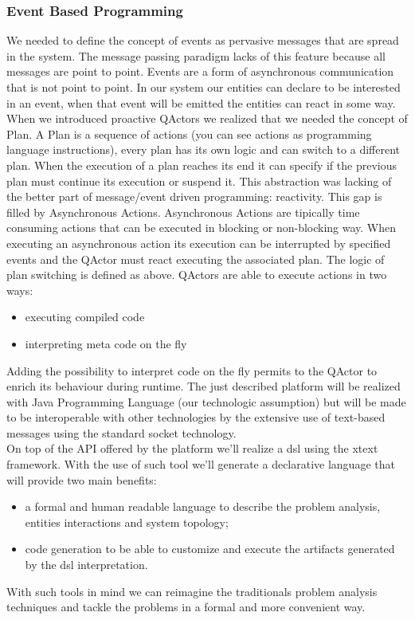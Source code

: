 \documentclass{llncs}
\begin{document}
\subsubsection{Event Based Programming}
	We needed to define the concept of events as pervasive messages that are spread in the system. The message passing paradigm lacks of this feature because all messages are point to point. Events are a form of asynchronous communication that is not point to point. In our system our entities can declare to be interested in an event, when that event will be emitted the entities can react in some way.\\
	When we introduced proactive QActors we realized that we needed the concept of Plan. A Plan is a sequence of actions (you can see actions as programming language instructions), every plan has its own logic and can switch to a different plan. When the execution of a plan reaches its end it can specify if the previous plan must continue its execution or suspend it.
	This abstraction was lacking of the better part of message/event driven programming: reactivity. This gap is filled by Asynchronous Actions.
	Asynchronous Actions are tipically time consuming actions that can be executed in blocking or non-blocking way. When executing an asynchronous action its execution can be interrupted by specified events and the QActor must react executing the associated plan. The logic of plan switching is defined as above.
	QActors are able to execute actions in two ways:
	\begin{itemize}
		\item executing compiled code
		\item interpreting meta code on the fly
	\end{itemize}
Adding the possibility to interpret code on the fly permits to the QActor to enrich its behaviour during runtime.
The just described platform will be realized with Java Programming Language (our technologic assumption) but will be made to be interoperable with other technologies by the extensive use of text-based messages using the standard socket technology.\\
On top of the API offered by the platform we'll realize a dsl using the xtext framework. With the use of such tool we'll generate a declarative language that will provide two main benefits:
\begin{itemize}
	\item a formal and human readable language to describe the problem analysis, entities interactions and system topology;
	\item code generation to be able to customize and execute the artifacts generated by the dsl interpretation.
\end{itemize}
With such tools in mind we can reimagine the traditionals problem analysis techniques and tackle the problems in a formal and more convenient way.
\end{document}
